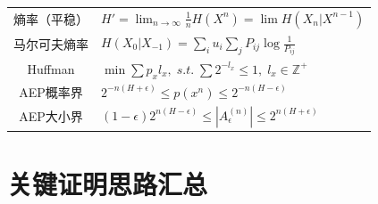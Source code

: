 \documentclass[12pt,a4paper]{ctexart}
\theoremstyle{definition}
\begin{document}
\begin{longtable}{c|>{\raggedright\arraybackslash}p{10.5cm}}
\rowcolor{red!10!white}
\multicolumn{2}{c}{\textbf{渐进理论与其它}} \\
\midrule
熵率（平稳） & $H' = \lim_{n\to\infty} \frac{1}{n}H(X^n) = \lim H(X_n|X^{n-1})$ \\
马尔可夫熵率 & $H(X_0|X_{-1}) = \sum_i u_i \sum_j P_{ij} \log\frac{1}{P_{ij}}$ \\
Huffman & $\min \sum p_x l_x,\; s.t.\; \sum 2^{-l_x} \leq 1,\; l_x \in \mathbb{Z}^+$ \\
AEP概率界 & $2^{-n(H+\epsilon)} \leq p(x^n) \leq 2^{-n(H-\epsilon)}$ \\
AEP大小界 & $(1-\epsilon)2^{n(H-\epsilon)} \leq |A_\epsilon^{(n)}| \leq 2^{n(H+\epsilon)}$ \\
\bottomrule
\end{longtable}

\section{关键证明思路汇总}
\end{document}
